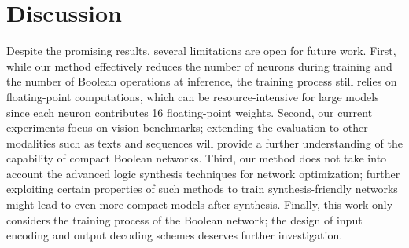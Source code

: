 \section{Discussion} \label{sec:discussion}

Despite the promising results, several limitations are open for future work. 
First, while our method effectively reduces the number of neurons during training and the number of Boolean operations at inference, 
the training process still relies on floating-point computations, which can be resource-intensive for large models since each neuron contributes 
16 floating-point weights.
Second, our current experiments focus on vision benchmarks; 
extending the evaluation to other modalities such as texts and sequences 
will provide a further understanding of the capability of compact Boolean networks.
Third, our method does not take into account
the advanced logic synthesis techniques for network optimization;
further exploiting certain properties of such methods to train synthesis-friendly networks
might lead to even more compact models after synthesis.
Finally, this work only considers the training process of the Boolean network; the design of input encoding and output decoding schemes 
deserves further investigation.
